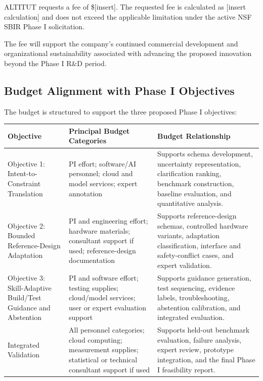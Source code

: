 \documentclass[11pt,letterpaper]{article}
\begin{document}
ALTITUT requests a fee of \$[insert]. The requested fee is calculated as
[insert calculation] and does not exceed the applicable limitation under the
active NSF SBIR Phase I solicitation.

The fee will support the company's continued commercial development and
organizational sustainability associated with advancing the proposed
innovation beyond the Phase I R\&D period.

\subsection*{Budget Alignment with Phase I Objectives}

The budget is structured to support the three proposed Phase I objectives:

\begin{table}[htbp]
\centering
\renewcommand{\arraystretch}{1.3}
\begin{tabularx}{\textwidth}{
    p{}
    p{}
    X
}
\toprule
\textbf{Objective} &
\textbf{Principal Budget Categories} &
\textbf{Budget Relationship} \\
\midrule

Objective 1:
Intent-to-Constraint Translation &
PI effort; software/AI personnel; cloud and model services; expert annotation &
Supports schema development, uncertainty representation, clarification
ranking, benchmark construction, baseline evaluation, and quantitative
analysis. \\

Objective 2:
Bounded Reference-Design Adaptation &
PI and engineering effort; hardware materials; consultant support if used;
reference-design documentation &
Supports reference-design schemas, controlled hardware variants, adaptation
classification, interface and safety-conflict cases, and expert validation. \\

Objective 3:
Skill-Adaptive Build/Test Guidance and Abstention &
PI and software effort; testing supplies; cloud/model services; user or expert
evaluation support &
Supports guidance generation, test sequencing, evidence labels,
troubleshooting, abstention calibration, and integrated evaluation. \\

Integrated Validation &
All personnel categories; cloud computing; measurement supplies; statistical
or technical consultant support if used &
Supports held-out benchmark evaluation, failure analysis, expert review,
prototype integration, and the final Phase I feasibility report. \\

\bottomrule
\end{tabularx}
\end{table}
\end{document}
